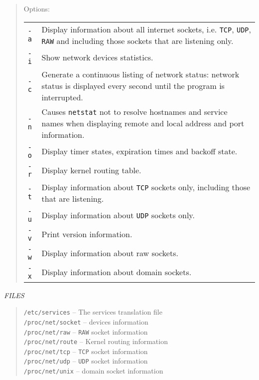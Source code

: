 \begin{appendix}
\begin{english}
\begin{quote}
	Options:\\
	\begin{tabular}{lp{8cm}}
	{\tt -a}	&	Display information about all internet sockets,
					i.e. {\tt TCP}, {\tt UDP}, {\tt RAW} and {\Unix}
					including those sockets that are listening only.\\
	{\tt -i}	&	Show network devices statistics.\\
	{\tt -c}	&	Generate a continuous listing of network status:
					network status is displayed every second until the
					program is interrupted.\\
	{\tt -n}	&	Causes {\tt netstat} not to resolve hostnames and service
					names when displaying remote and local address and
					port information.\\
	{\tt -o}	&	Display timer states, expiration times and backoff
					state.\\
	{\tt -r}	&	Display kernel routing table.\\
	{\tt -t}	&	Display information about {\tt TCP} sockets only, including
					those that are listening.\\
	{\tt -u}	&	Display information about {\tt UDP} sockets only.\\
	{\tt -v}	&	Print version information.\\
	{\tt -w}	&	Display information about raw sockets.\\
	{\tt -x}	&	Display information about {\Unix} domain sockets.
	\end{tabular}
\end{quote}

{\sl FILES}
\begin{quote}
	{\tt /etc/services} -- The services translation file\\

	{\tt /proc/net/socket} -- devices information\\

	{\tt /proc/net/raw} -- {\tt RAW} socket information\\

	{\tt /proc/net/route} -- Kernel routing information\\

	{\tt /proc/net/tcp} -- {\tt TCP} socket information\\

	{\tt /proc/net/udp} -- {\tt UDP} socket information\\

	{\tt /proc/net/unix} -- {\Unix} domain socket information
\end{quote}


\end{english}
\end{appendix}
